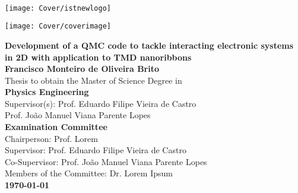 \setcounter{page}{1} 


\thispagestyle{empty}

\begin{flushleft} ~\\ \vspace{-12mm} \hspace{-12mm}
\texttt{[image: Cover/istnewlogo]}
\vspace{10mm}
\\ \begin{center} \texttt{[image: Cover/coverimage]}  \end{center} %
 \vspace{5mm}
\centering
\LARGE \textbf{Development of a QMC code to tackle interacting electronic systems in 2D with application to TMD nanoribbons}
\\
\vspace{15mm}
\Large \textbf{Francisco Monteiro de Oliveira Brito} \\
\vspace{12mm}
\large Thesis to obtain the Master of Science Degree in
\\ \vspace{2mm}
\LARGE \textbf{Physics Engineering}
\\ \vspace{10mm}
\large Supervisor(s): Prof. Eduardo Filipe Vieira de Castro  \\
\large Prof. João Manuel Viana Parente Lopes 
\\ \vspace{10mm}
\Large \textbf{Examination Committee}
\\ \vspace{5mm}
\large Chairperson: Prof. Lorem \\
\large Supervisor: Prof. Eduardo Filipe Vieira de Castro \\
\large Co-Supervisor: Prof. João Manuel Viana Parente Lopes  \\
\large Members of the Committee: Dr. Lorem Ipsum \\
\vspace{5mm}
\Large \textbf{\todaythesis\today} \\
\let\thepage\relax
\end{flushleft}
\pagebreak


\clearpage

\thispagestyle{empty}
\cleardoublepage

\setcounter{page}{1} 

\baselineskip 18pt %
